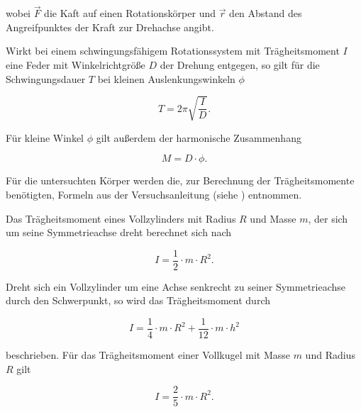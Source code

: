\noindent wobei $\vec{F}$ die Kaft auf einen
Rotationskörper und $\vec{r}$ den Abstand des 
Angreifpunktes der Kraft zur Drehachse angibt.

Wirkt bei einem schwingungsfähigem Rotationssystem
mit Trägheitsmoment $I$
eine Feder mit Winkelrichtgröße $D$ der Drehung entgegen,
so gilt für die Schwingungsdauer $T$ bei kleinen 
Auslenkungswinkeln $\phi$

\begin{equation}
    T=2\pi \sqrt{\frac{I}{D}}.
    \label{eq:fa2}
\end{equation}

\noindent Für kleine Winkel $\phi$ gilt außerdem der
harmonische Zusammenhang

\begin{equation}
    M=D \cdot \phi.
    \label{eq:fa3}
\end{equation}

\noindent Für die untersuchten Körper werden 
die, zur Berechnung der Trägheitsmomente benötigten,
Formeln aus der Versuchsanleitung (siehe \cite{sample}) entnommen.

Das Trägheitsmoment eines Vollzylinders mit Radius $R$
und Masse $m$, der sich um seine
Symmetrieachse dreht berechnet sich nach

\begin{equation}
    I=\frac{1}{2} \cdot m \cdot R^2.
    \label{eq:zyl1}
\end{equation}

\noindent Dreht sich ein Vollzylinder um eine Achse senkrecht
zu seiner Symmetrieachse durch den Schwerpunkt, so wird das Trägheitsmoment durch

\begin{equation}
    I=\frac{1}{4} \cdot m \cdot R^2 + \frac{1}{12} \cdot m \cdot h^2
    \label{eq:zyl2}
\end{equation}

\noindent beschrieben. Für das Trägheitsmoment einer
Vollkugel  mit Masse $m$ und Radius $R$ gilt

\begin{equation}
    I=\frac{2}{5} \cdot m \cdot R^2.
    \label{eq:Kugel}
\end{equation}